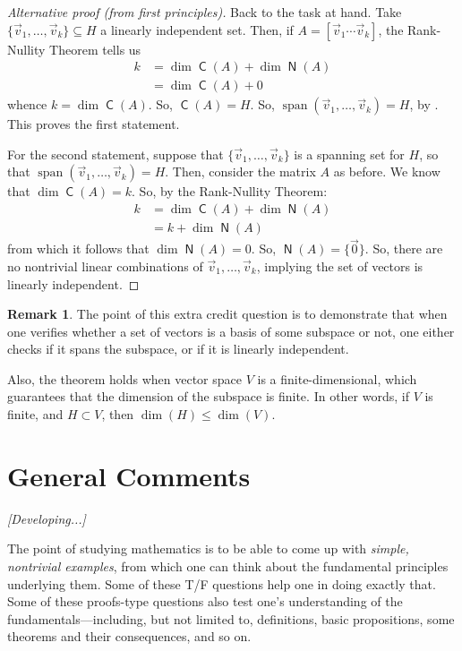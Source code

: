 \documentclass{amsart}
\theoremstyle{definition}
\newtheorem{remark}[definition]{Remark}
\theoremstyle{definition}
\DeclareMathOperator{\1}{\mathbbm{1}}
\DeclareMathOperator{\Span}{span}
\DeclareMathOperator{\col}{\mathsf{C}}
\DeclareMathOperator{\nul}{\mathsf{N}}
\renewcommand{\leq}{\leqslant}
\begin{document}
\begin{enumerate}[itemsep = 2mm]
\begin{proof}[Alternative proof (from first principles)]
		Back to the task at hand. Take $\{ \vec{v}_1,\ldots, \vec{v}_k\}\subseteq H$ a linearly independent set. Then, if $A=[\vec{v}_1\cdots \vec{v}_k]$, the Rank-Nullity Theorem tells us 
		\begin{align*}
		k&=\dim\col(A)+\dim\nul(A)\\
		&=\dim\col(A)+0
		\end{align*}
		whence $k=\dim\col(A).$ So, $\col(A)=H$. So, $\Span(\vec{v}_1,\ldots, \vec{v}_k)=H$, by . This proves the first statement.
		
		For the second statement, suppose that $\{\vec{v}_1,\ldots, \vec{v}_k\}$ is a spanning set for $H$, so that $\Span(\vec{v}_1,\ldots, \vec{v}_k)=H$. Then, consider the matrix $A$ as before. We know that $\dim\col(A)=k$. So, by the Rank-Nullity Theorem:
		\begin{align*}
		k&=\dim\col(A)+\dim\nul(A)\\
		&=k+\dim\nul(A)
		\end{align*}
		from which it follows that $\dim\nul(A)=0$. So, $\nul(A)=\{\vec{0}\}$. So, there are no nontrivial linear combinations of $\vec{v}_1,\ldots, \vec{v}_k$, implying the set of vectors is linearly independent.
		\end{proof}
		
	
		\begin{remark}
			The point of this extra credit question is to demonstrate that when one verifies whether a set of vectors is a basis of some subspace or not, one either checks if it spans the subspace, or if it is linearly independent. 
			
			Also, the theorem holds when vector space $V$ is a finite-dimensional, which guarantees that the dimension of the subspace is finite. In other words, if $V$ is finite, and $H \subset V$, then $\dim(H) \leq \dim(V)$.
		\end{remark}
	\end{enumerate}
	
	
	\clearpage
	
	
\section*{General Comments}

\noindent \textit{[Developing...]}

The point of studying mathematics is to be able to come up with \textit{simple, nontrivial examples}, from which one can think about the fundamental principles underlying them. Some of these T/F questions help one in doing exactly that. Some of these proofs-type questions also test one's understanding of the fundamentals---including, but not limited to, definitions, basic propositions, some theorems and their consequences, and so on.
\end{document}
